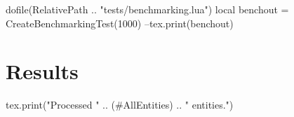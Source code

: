 \documentclass[oneside]{memoir}
\begin{document}
\pagestyle{empty}

\begin{luacode*}
	dofile(RelativePath .. "tests/benchmarking.lua")
	local benchout = CreateBenchmarkingTest(1000)
	--tex.print(benchout)
\end{luacode*}

\chapter*{Results}

\begin{luacode*}
	tex.print("Processed " .. (#AllEntities) .. " entities.")
\end{luacode*}

\PrintRpgTexErrors

\PrintRpgTexBenchmarking
\end{document}
